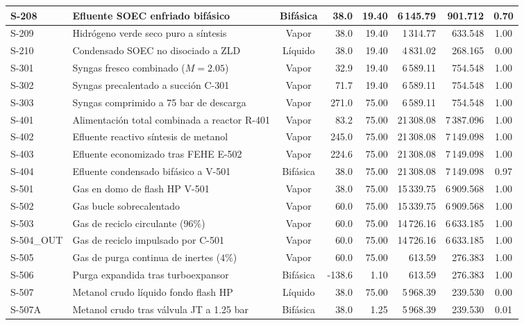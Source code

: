 \documentclass[10pt,letterpaper]{article}
\begin{document}
\begin{landscape}
\begin{xltabular}{\linewidth}{|l|p{6.0cm}|c|r|r|r|r|c|}
S-208 & Efluente SOEC enfriado bifásico & Bifásica & 38.0 & 19.40 & 6\,145.79 & 901.712 & 0.70 \\ \hline
S-209 & Hidrógeno verde seco puro a síntesis & Vapor & 38.0 & 19.40 & 1\,314.77 & 633.548 & 1.00 \\ \hline
S-210 & Condensado SOEC no disociado a ZLD & Líquido & 38.0 & 19.40 & 4\,831.02 & 268.165 & 0.00 \\ \hline
S-301 & Syngas fresco combinado ($M=2.05$) & Vapor & 32.9 & 19.40 & 6\,589.11 & 754.548 & 1.00 \\ \hline
S-302 & Syngas precalentado a succión C-301 & Vapor & 71.7 & 19.40 & 6\,589.11 & 754.548 & 1.00 \\ \hline
S-303 & Syngas comprimido a 75 bar de descarga & Vapor & 271.0 & 75.00 & 6\,589.11 & 754.548 & 1.00 \\ \hline
S-401 & Alimentación total combinada a reactor R-401 & Vapor & 83.2 & 75.00 & 21\,308.08 & 7\,387.096 & 1.00 \\ \hline
S-402 & Efluente reactivo síntesis de metanol & Vapor & 245.0 & 75.00 & 21\,308.08 & 7\,149.098 & 1.00 \\ \hline
S-403 & Efluente economizado tras FEHE E-502 & Vapor & 224.6 & 75.00 & 21\,308.08 & 7\,149.098 & 1.00 \\ \hline
S-404 & Efluente condensado bifásico a V-501 & Bifásica & 38.0 & 75.00 & 21\,308.08 & 7\,149.098 & 0.97 \\ \hline
S-501 & Gas en domo de flash HP V-501 & Vapor & 38.0 & 75.00 & 15\,339.75 & 6\,909.568 & 1.00 \\ \hline
S-502 & Gas bucle sobrecalentado & Vapor & 60.0 & 75.00 & 15\,339.75 & 6\,909.568 & 1.00 \\ \hline
S-503 & Gas de reciclo circulante ($96\%$) & Vapor & 60.0 & 75.00 & 14\,726.16 & 6\,633.185 & 1.00 \\ \hline
S-504\_OUT & Gas de reciclo impulsado por C-501 & Vapor & 60.0 & 75.00 & 14\,726.16 & 6\,633.185 & 1.00 \\ \hline
S-505 & Gas de purga continua de inertes ($4\%$) & Vapor & 60.0 & 75.00 & 613.59 & 276.383 & 1.00 \\ \hline
S-506 & Purga expandida tras turboexpansor & Bifásica & -138.6 & 1.10 & 613.59 & 276.383 & 1.00 \\ \hline
S-507 & Metanol crudo líquido fondo flash HP & Líquido & 38.0 & 75.00 & 5\,968.39 & 239.530 & 0.00 \\ \hline
S-507A & Metanol crudo tras válvula JT a 1.25 bar & Bifásica & 38.0 & 1.25 & 5\,968.39 & 239.530 & 0.01 \\ \hline

\end{xltabular}
\end{landscape}
\end{document}
